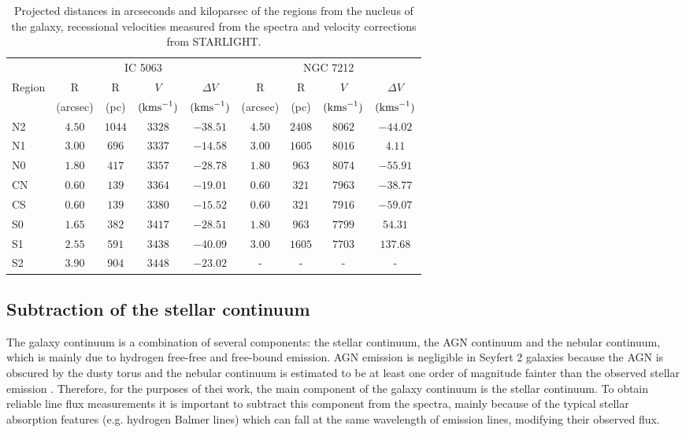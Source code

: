 \documentclass[../main.tex]{subfiles}
\begin{document}
\begin{table}
\caption[]{Projected distances in arcseconds and kiloparsec of the regions from the nucleus of the galaxy, recessional velocities measured from the spectra and velocity corrections from STARLIGHT.}
\label{tab:reg}
\centering
\small
\begin{tabular}[width=\columnwidth]{lcccccccc}
\hline
& \multicolumn{4}{c}{IC 5063}&\multicolumn{4}{c}{NGC 7212}\\
Region& R&R&$V$&$\Delta V$&R&R&$V$&$\Delta V$\\
& (arcsec)& (pc)&$(\si{\kms})$&$(\si{\kms})$&(arcsec)&(pc)&$(\si{\kms})$&$(\si{\kms})$\\
\hline
N2&$4.50$&$1044$&$3328$&$-38.51$&$4.50$&$2408$&$8062$&$-44.02$\\
N1&$3.00$&$696$&$3337$&$-14.58$&$3.00$&$1605$&$8016$&$4.11$\\
N0&$1.80$&$417$&$3357$&$-28.78$&$1.80$&$963$&$8074$&$-55.91$\\
CN&$0.60$&$139$&$3364$&$-19.01$&$0.60$&$321$&$7963$&$-38.77$\\
CS&$0.60$&$139$&$3380$&$-15.52$&$0.60$&$321$&$7916$&$-59.07$\\
S0&$1.65$&$382$&$3417$&$-28.51$&$1.80$&$963$&$7799$&$54.31$\\
S1&$2.55$&$591$&$3438$&$-40.09$&$3.00$&$1605$&$7703$&$137.68$\\
S2&$3.90$&$904$&$3448$&$-23.02$&-&-&-&-\\
\hline
\end{tabular}
\normalsize
\end{table}

\subsection{Subtraction of the stellar continuum}
\label{sec:starcont}


The galaxy continuum is a combination of several components: the stellar continuum, the AGN continuum and the nebular continuum, which is mainly due to hydrogen free-free and free-bound emission.
AGN emission is negligible in Seyfert 2 galaxies because the AGN is obscured by the dusty torus \citep[e.g.][]{Beckmann12} and the nebular continuum is estimated to be at least one order of magnitude fainter than the observed stellar emission \citep{OsterbrockAGN89}.
Therefore, for the purposes of thei work, the main component of the galaxy continuum is the stellar continuum.
To obtain reliable line flux measurements it is important to subtract this component from the spectra, mainly because of the typical stellar absorption features (e.g. hydrogen Balmer lines) which can fall at the same wavelength of emission lines, modifying their observed flux.
\end{document}
